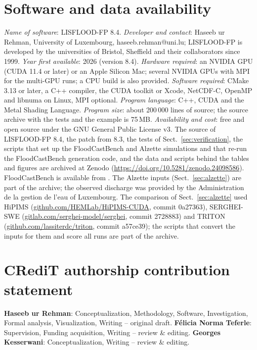 \documentclass[preprint,12pt,authoryear]{elsarticle}
\begin{document}
\section*{Software and data availability}
\textit{Name of software}: LISFLOOD-FP 8.4. \textit{Developer and contact}:
Haseeb ur Rehman, University of Luxembourg, haseeb.rehman@uni.lu; LISFLOOD-FP
is developed by the universities of Bristol, Sheffield and their collaborators
since 1999. \textit{Year first available}: 2026 (version 8.4). \textit{Hardware
required}: an NVIDIA GPU (CUDA 11.4 or later) or an Apple Silicon Mac; several
NVIDIA GPUs with MPI for the multi-GPU runs; a CPU build is also provided.
\textit{Software required}: CMake 3.13 or later, a C++ compiler, the CUDA
toolkit or Xcode, NetCDF-C, OpenMP and libnuma on Linux, MPI optional.
\textit{Program language}: C++, CUDA and the Metal Shading Language.
\textit{Program size}: about 200\,000 lines of source; the source archive with
the tests and the example is 75\,MB. \textit{Availability and cost}: free and
open source under the GNU General Public License v3. The source of LISFLOOD-FP
8.4, the patch from 8.3, the tests of Sect.~\ref{sec:verification}, the scripts
that set up the FloodCastBench and Alzette simulations and that re-run the
FloodCastBench generation code, and the data and scripts behind the tables and
figures are archived at Zenodo (\url{https://doi.org/10.5281/zenodo.24098586}). FloodCastBench is available from
\citet{Xu2025floodcastbench}. The Alzette inputs (Sect.~\ref{sec:alzette})
are part of the archive; the observed discharge was provided by
the Administration de la gestion de l'eau of Luxembourg. The comparison of
Sect.~\ref{sec:alzette} used HiPIMS (\url{github.com/HEMLab/HiPIMS-CUDA},
commit 0a27363), SERGHEI-SWE (\url{gitlab.com/serghei-model/serghei}, commit
2728883) and TRITON (\url{github.com/lassiterdc/triton}, commit a57ce39); the
scripts that convert the inputs for them and score all runs are part of the
archive.

\section*{CRediT authorship contribution statement}
\textbf{Haseeb ur Rehman}: Conceptualization, Methodology, Software,
Investigation, Formal analysis, Visualization, Writing -- original draft.
\textbf{F\'{e}licia Norma Teferle}: Supervision, Funding acquisition,
Writing -- review \& editing. \textbf{Georges Kesserwani}: Conceptualization,
Writing -- review \& editing.
\end{document}
